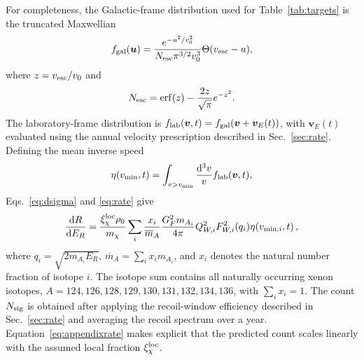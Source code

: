 \documentclass[aps,prd,reprint,preprintnumbers,superscriptaddress,nofootinbib,floatfix]{revtex4-2}
\newcommand{\dd}{\mathrm{d}}
\begin{document}
For completeness, the Galactic-frame distribution used for Table~\ref{tab:targets} is the truncated Maxwellian
\begin{equation}
    f_{\rm gal}(\bm u)= \frac{e^{-u^2/v_0^2}}{N_{\rm esc}\pi^{3/2}v_0^3}\Theta(v_{\rm esc}-u),
\end{equation}
where $z=v_{\rm esc}/v_0$ and
\begin{equation}
    N_{\rm esc}=\operatorname{erf}(z)-\frac{2z}{\sqrt{\pi}}e^{-z^2}.
\end{equation}
The laboratory-frame distribution is $f_{\rm lab}(\bm v,t)=f_{\rm gal}(\bm v+\bm v_E(t))$, with $\bm v_E(t)$ evaluated using the annual velocity prescription described in Sec.~\ref{sec:rate}. Defining the mean inverse speed
\begin{equation}
    \eta(v_{\min},t)= \int_{v>v_{\min}}\frac{\dd^3v}{v}f_{\rm lab}(\bm v,t),
\end{equation}
Eqs.~\eqref{eq:dsigma} and \eqref{eq:rate} give
\begin{equation}
    \frac{\dd R}{\dd E_R} = \frac{\xi_\chi^{\rm loc}\rho_0}{m_\chi}\sum_i\frac{x_i}{\overline m_A}\frac{G_F^2m_{A_i}}{4\pi}Q_{W,i}^2F_{W,i}^2(q_i)\eta\!\left(v_{\min,i},t\right),
\label{eq:appendixrate}
\end{equation}
where $q_i=\sqrt{2m_{A_i}E_R}$, $\overline m_A=\sum_i x_i m_{A_i}$, and $x_i$ denotes the natural number fraction of isotope $i$. The isotope sum contains all naturally occurring xenon isotopes, $A=124,126,128,129,130,131,132,134,136$, with $\sum_i x_i=1$. The count $N_{\rm sig}$ is obtained after applying the recoil-window efficiency described in Sec.~\ref{sec:rate} and averaging the recoil spectrum over a year. Equation~\eqref{eq:appendixrate} makes explicit that the predicted count scales linearly with the assumed local fraction $\xi_\chi^{\rm loc}$.



\end{document}
